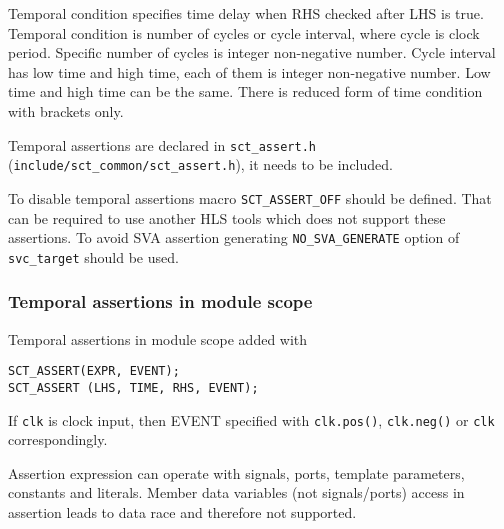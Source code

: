 Temporal condition specifies time delay when RHS checked after LHS is true. Temporal condition is number of cycles or cycle interval, where cycle is clock period. Specific number of cycles is integer non-negative number. Cycle interval has low time and high time, each of them is integer non-negative number. Low time and high time can be the same. There is reduced form of time condition with brackets only.

Temporal assertions are declared in {\tt sct\_assert.h} ({\tt include/sct\_common/sct\_assert.h}), it needs to be included. 

To disable temporal assertions macro {\tt SCT\_ASSERT\_OFF} should be defined. That can be required to use another HLS tools which does not support these assertions.
To avoid SVA assertion generating {\tt NO\_SVA\_GENERATE} option of {\tt svc\_target} should be used. 

\subsubsection{Temporal assertions in module scope}

Temporal assertions in module scope added with 

\begin{lstlisting}[style=mycpp]
SCT_ASSERT(EXPR, EVENT);
SCT_ASSERT (LHS, TIME, RHS, EVENT);
\end{lstlisting}
%
If {\tt clk} is clock input, then EVENT specified with {\tt clk.pos()}, {\tt clk.neg()} or {\tt clk} correspondingly. 

Assertion expression can operate with signals, ports, template parameters, constants and literals. Member data variables (not signals/ports) access in assertion leads to data race and therefore not supported. 

